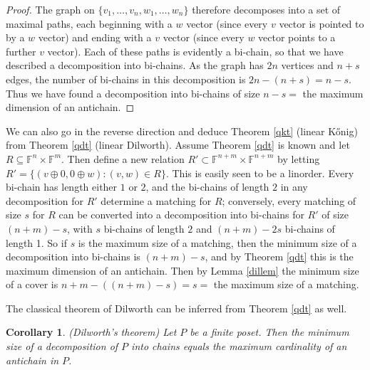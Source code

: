 \documentclass[10pt,a4paper]{amsart}
\newtheorem{cor}[thm]{Corollary}
\begin{document}
\begin{proof}
The graph on $\{v_1, \ldots, v_n, w_1, \ldots, w_n\}$ therefore decomposes into a set of maximal paths, each beginning with a $w$ vector (since every $v$ vector is pointed to by a $w$ vector) and ending with a $v$ vector (since every $w$ vector points to a further $v$ vector). Each of these paths is evidently a bi-chain, so that we have described a decomposition into bi-chains. As the graph has $2n$ vertices and $n + s$ edges, the number of bi-chains in this decomposition is $2n - (n + s) = n - s$. Thus we have found a decomposition into bi-chains of size $n - s =$ the maximum dimension of an antichain.
\end{proof}

We can also go in the reverse direction and deduce Theorem \ref{qkt} (linear Kőnig) from Theorem \ref{qdt} (linear Dilworth). Assume Theorem \ref{qdt} is known and let $R \subseteq \mathbb{F}^n \times \mathbb{F}^m$. Then define a new relation $R' \subset \mathbb{F}^{n + m} \times \mathbb{F}^{n + m}$ by letting $R' = \{(v \oplus 0,0 \oplus w): (v,w) \in R\}$. This is easily seen to be a linorder. Every bi-chain has length either $1$ or $2$, and the bi-chains of length $2$ in any decomposition for $R'$ determine a matching for $R$; conversely, every matching of size $s$ for $R$ can be converted into a decomposition into bi-chains for $R'$ of size $(n + m) - s$, with $s$ bi-chains of length $2$ and $(n + m) - 2s$ bi-chains of length 1. So if $s$ is the maximum size of a matching, then the minimum size of a decomposition into bi-chains is $(n + m) - s$, and by Theorem \ref{qdt} this is the maximum dimension of an antichain. Then by Lemma \ref{dillem} the minimum size of a cover is $n + m - ((n + m) - s) = s =$ the maximum size of a matching.

The classical theorem of Dilworth can be inferred from Theorem \ref{qdt} as well.

\begin{cor} (Dilworth's theorem)
Let $P$ be a finite poset. Then the minimum size of a decomposition of $P$ into chains equals the maximum cardinality of an antichain in $P$.
\end{cor}
\end{document}
